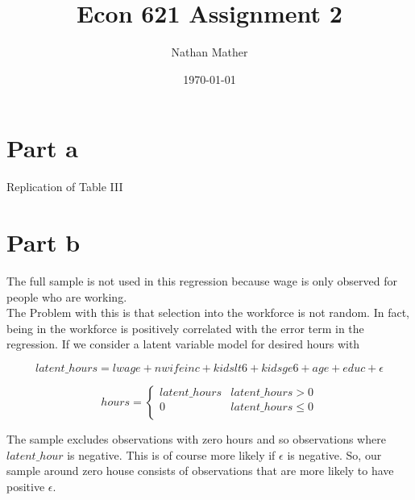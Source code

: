 \documentclass[11pt]{article}
\title{Econ 621 Assignment 2} %
\author{Nathan Mather} %
\date{\today} %
\begin{document}
\maketitle %

\setcounter{tocdepth}{2} %


\section*{Part a}

Replication of Table III

\begin{center}
	
\end{center}

\section*{Part b}

The full sample is not used in this regression because wage is only observed for 
people who are working. \\

The Problem with this is that selection into the workforce is not random. In fact, being in the workforce is positively correlated with the error term in the regression. If we consider a latent variable model for desired hours with 

$$ latent \_ hours= lwage + nwifeinc + kidslt6 + kidsge6  + age + educ + \epsilon $$



\[
hours = 
 \begin{cases} 
latent \_ hours & latent \_ hours > 0 \\
0 & latent \_ hours \leq 0 \\
\end{cases}
\]

The sample excludes observations with zero hours and so observations where $latent \_ hour$ is negative. This is of course more likely if $\epsilon$ is negative. So, our sample around zero house consists of observations that are more likely to have positive $\epsilon$. \\
\end{document}
